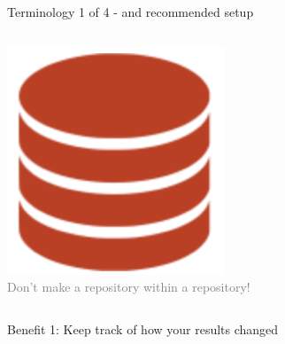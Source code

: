 \documentclass[ignorenonframetext, 10pt, aspectratio=169]{beamer}
\begin{document}
\begin{frame}{Terminology 1 of 4  - and recommended setup}
\begin{columns}[T]
\begin{column}{0.35\textwidth}
\bigskip
\bigskip
{}\includegraphics[width = 0.25\linewidth]{repo-0.png}\\

\flushright
\textcolor{gray}{\footnotesize Don't make a repository within a repository!}
\end{column}
\end{columns}
\end{frame}

\begin{frame}{Benefit 1: Keep track of how your results changed}
\begin{columns}[T]
\begin{column}{0.2\textwidth}


\end{column}
\end{columns}
\end{frame}
\end{document}
